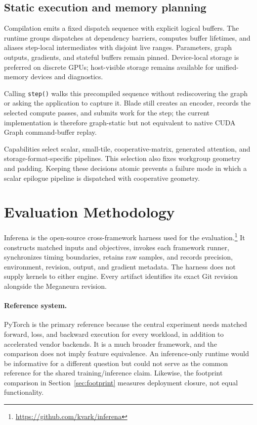 \documentclass[10pt,twocolumn]{article}
\newcommand{\system}{Meganeura}
\newcommand{\inferena}{Inferena}
\newcommand{\code}[1]{\texttt{#1}}
\begin{document}
\subsection{Static execution and memory planning}
\label{sec:memplan}

Compilation emits a fixed dispatch sequence with explicit logical buffers.
The runtime groups dispatches at dependency barriers, computes buffer
lifetimes, and aliases step-local intermediates with disjoint live ranges.
Parameters, graph outputs, gradients, and stateful buffers remain pinned.
Device-local storage is preferred on discrete GPUs; host-visible storage
remains available for unified-memory devices and diagnostics.

Calling \code{step()} walks this precompiled sequence without rediscovering
the graph or asking the application to capture it. Blade still creates an
encoder, records the selected compute passes, and submits work for the step;
the current implementation is therefore graph-static but not equivalent to
native CUDA Graph command-buffer replay.

Capabilities select scalar, small-tile, cooperative-matrix, generated
attention, and storage-format-specific pipelines. This selection also fixes
workgroup geometry and padding. Keeping these decisions atomic prevents a
failure mode in which a scalar epilogue pipeline is dispatched with
cooperative geometry.

\section{Evaluation Methodology}
\label{sec:method}

\inferena{} is the open-source cross-framework harness used for the
evaluation.\footnote{\url{https://github.com/kvark/inferena}} It constructs
matched inputs and objectives, invokes each framework runner, synchronizes
timing boundaries, retains raw samples, and records precision, environment,
revision, output, and gradient metadata. The harness does not supply kernels
to either engine. Every artifact identifies its exact Git revision alongside
the \system{} revision.

\paragraph{Reference system.}
PyTorch is the primary reference because the central experiment needs matched
forward, loss, and backward execution for every workload, in addition to
accelerated vendor backends. It is a much broader framework, and the
comparison does not imply feature equivalence. An inference-only runtime would
be informative for a different question but could not serve as the common
reference for the shared training/inference claim. Likewise, the footprint
comparison in Section~\ref{sec:footprint} measures deployment closure, not
equal functionality.
\end{document}

